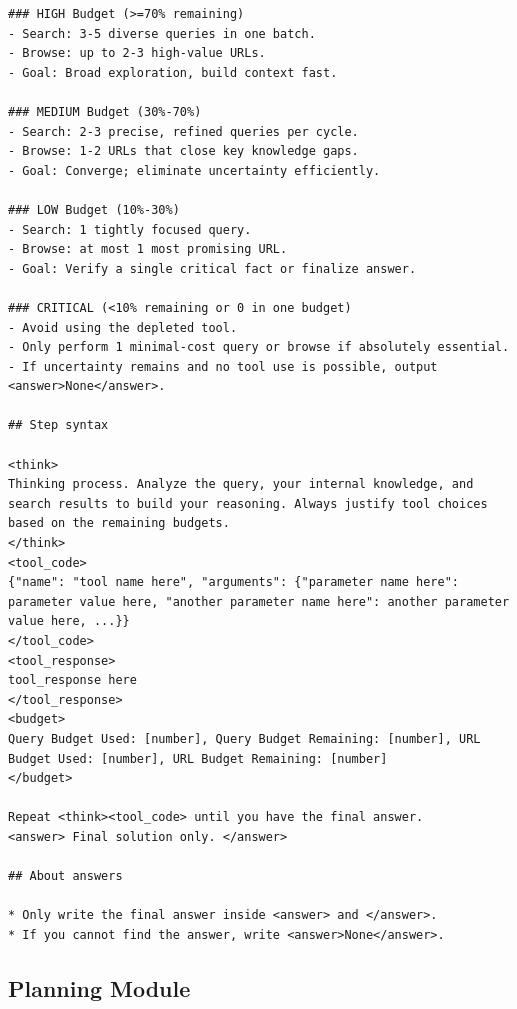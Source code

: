 \begin{center}
\begin{tcolorbox}[
  enhanced,
  breakable,                 %
  colback=white,
  colframe=black!50!white,
  title={ReAct + Budget Tracker},
  width=1.0\linewidth        %
]
\begin{lstlisting}
### HIGH Budget (>=70% remaining)
- Search: 3-5 diverse queries in one batch.
- Browse: up to 2-3 high-value URLs.
- Goal: Broad exploration, build context fast.

### MEDIUM Budget (30%-70%)
- Search: 2-3 precise, refined queries per cycle.
- Browse: 1-2 URLs that close key knowledge gaps.
- Goal: Converge; eliminate uncertainty efficiently.

### LOW Budget (10%-30%)
- Search: 1 tightly focused query.
- Browse: at most 1 most promising URL.
- Goal: Verify a single critical fact or finalize answer.

### CRITICAL (<10% remaining or 0 in one budget)
- Avoid using the depleted tool.
- Only perform 1 minimal-cost query or browse if absolutely essential.
- If uncertainty remains and no tool use is possible, output <answer>None</answer>.

## Step syntax

<think>
Thinking process. Analyze the query, your internal knowledge, and search results to build your reasoning. Always justify tool choices based on the remaining budgets.
</think>
<tool_code>
{"name": "tool name here", "arguments": {"parameter name here": parameter value here, "another parameter name here": another parameter value here, ...}}
</tool_code>
<tool_response>
tool_response here
</tool_response>
<budget>
Query Budget Used: [number], Query Budget Remaining: [number], URL Budget Used: [number], URL Budget Remaining: [number]
</budget>

Repeat <think><tool_code> until you have the final answer.
<answer> Final solution only. </answer> 

## About answers

* Only write the final answer inside <answer> and </answer>.
* If you cannot find the answer, write <answer>None</answer>.
\end{lstlisting}
\end{tcolorbox}
\captionsetup{justification=centering} 
\label{fig:prompt_plan}
\end{center}



\subsection{Planning Module}\label{app:prompt_plan}

